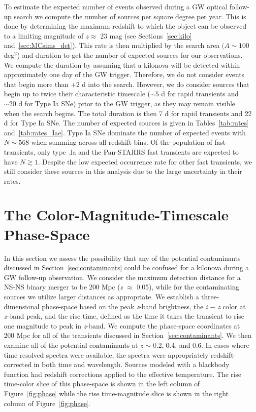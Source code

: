 To estimate the expected number of events observed during a GW optical follow-up search we compute the number of sources per square degree per year. This is done by determining the maximum redshift to which the object can be observed to a limiting magnitude of $z \approx$ 23 mag (see Sections~\ref{sec:kilo} and~\ref{sec:MCsims_det}). This rate is then multiplied by the search area $(A \sim 100$ deg$^2$) and duration to get the number of expected sources for our observations. We compute the duration by assuming that a kilonova will be detected within approximately one day of the GW trigger. Therefore, we do not consider events that begin more than +2 d into the search. However, we do consider sources that begin up to twice their characteristic timescale ($\sim5$ d for rapid transients and $\sim 20$ d for Type Ia SNe) prior to the GW trigger, as they may remain visible when the search begins. The total duration is then 7 d for rapid transients and 22 d for Type Ia SNe. The number of expected sources is given in Tables~\ref{tab:rates} and~\ref{tab:rates_Iae}. Type Ia SNe dominate the number of expected events with $N \sim 568$ when summing across all redshift bins. Of the population of fast transients, only type .Ia and the Pan-STARRS fast transients are expected to have $N \gtrsim 1$. Despite the low expected occurrence rate for other fast transients, we still consider these sources in this analysis due to the large uncertainty in their rates.

\section{The Color-Magnitude-Timescale Phase-Space}
\label{sec:phase}      
In this section we assess the possibility that any of the potential contaminants discussed in Section~\ref{sec:contaminants} could be confused  for a kilonova during a GW follow-up observation. We consider the maximum detection distance for a NS-NS binary merger to be 200 Mpc ({\em z} $\approx$ 0.05), while for the contaminating sources we utilize larger distances as appropriate. We establish a three-dimensional phase-space based on the peak {\em z}-band brightness, the {\em i} $-$ {\em z} color at {\em z}-band peak, and the rise time, defined as the time it takes the transient to rise one magnitude to peak in {\em z}-band. We compute the phase-space coordinates at 200 Mpc for all of the transients discussed in Section~\ref{sec:contaminants}. We then examine all of the potential contaminants at {\em z} $\sim$ 0.2, 0.4, and 0.6. In cases where time resolved spectra were available, the spectra were appropriately redshift-corrected in both time and wavelength. Sources modeled with a blackbody function had redshift corrections applied to the effective temperature. The rise time-color slice of this phase-space is shown in the left column of Figure~\ref{fig:phase} while the rise time-magnitude slice is shown in the right column of Figure~\ref{fig:phase}.
   
